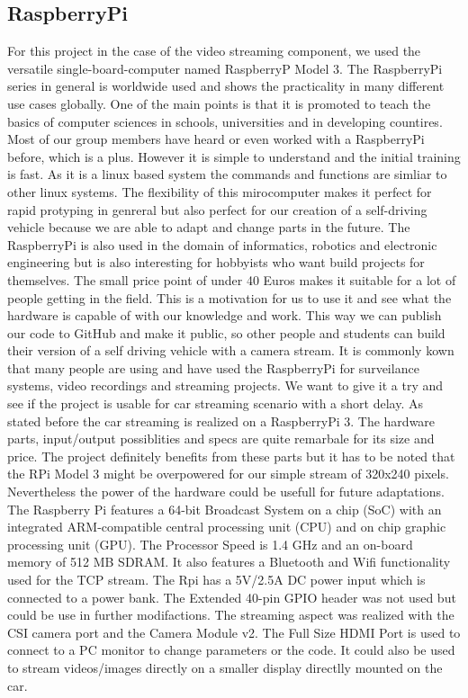 \documentclass[conference]{IEEEtran}
\begin{document}
\subsection{RaspberryPi}
For this project in the case of the video streaming component, we used the versatile single-board-computer named RaspberryP Model 3. The RaspberryPi series in general is worldwide used and shows the practicality in many different use cases globally. One of the main points is that it is promoted to teach the basics of computer sciences in schools, universities and in developing countires. Most of our group members have heard or even worked with a RaspberryPi before, which is a plus. However it is simple to understand and the initial training is fast. As it is a linux based system the commands and functions are simliar to other linux systems. The flexibility of this mirocomputer makes it perfect for rapid protyping in genreral but also perfect for our creation of a self-driving vehicle because we are able to adapt and change parts in the future. The RaspberryPi is also used in the domain of informatics, robotics and electronic engineering but is also interesting for hobbyists who want build projects for themselves. The small price point of under 40 Euros makes it suitable for a lot of people getting in the field. This is a motivation for us to use it and see what the hardware is capable of with our knowledge and work. This way we can publish our code to GitHub and make it public, so other people and students can build their version of a self driving vehicle with a camera stream. It is commonly kown that many people are using and have used the RaspberryPi for surveilance systems, video recordings and streaming projects. We want to give it a try and see if the project is usable for car streaming scenario with a short delay.
\newline
As stated before the car streaming is realized on a RaspberryPi 3. The hardware parts, input/output possiblities and specs are quite remarbale for its size and price. The project definitely benefits from these parts but it has to be noted that the RPi Model 3 might be overpowered for our simple stream of 320x240 pixels. Nevertheless the power of the hardware could be usefull for future adaptations. The Raspberry Pi features a 64-bit Broadcast System on a chip (SoC) with an integrated ARM-compatible central processing unit (CPU) and on chip graphic processing unit (GPU). The Processor Speed is 1.4 GHz and an on-board memory of 512 MB SDRAM. It also features a Bluetooth and Wifi functionality used for the TCP stream. The Rpi has a 5V/2.5A DC power input which is connected to a power bank. The Extended 40-pin GPIO header was not used but could be use in further modifactions. The streaming aspect was realized with the CSI camera port and the Camera Module v2. The Full Size HDMI Port is used to connect to a PC monitor to change parameters or the code. It could also be used to stream videos/images  directly on a smaller display directlly mounted on the car. 
\end{document}
